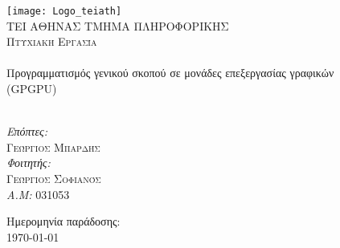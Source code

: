 \begin{titlepage}
\begin{center}

\texttt{[image: Logo\_teiath]}~\\[1cm]

\textsc{\LARGE ΤΕΙ ΑΘΗΝΑΣ ΤΜΗΜΑ ΠΛΗΡΟΦΟΡΙΚΗΣ}\\[1.5cm]

\textsc{\Large Πτυχιακή Εργασία}\\[0.5cm]

\HRule \\[0.4cm]
{\Large Προγραμματισμός γενικού σκοπού σε μονάδες επεξεργασίας γραφικών\\[0.4cm] (GPGPU)} \\[0.4cm]

\HRule \\[1.5cm]

\centering

\emph{Επόπτες:} \\
\textsc{Γεώργιος Μπαρδής}\\[2.5cm]

\emph{Φοιτητής:}\\
\textsc{Γεώργιος Σοφιανός}\\
\emph{A.M:} 031053


\vfill

{Ημερομηνία παράδοσης: \\ \today}

\end{center}
\end{titlepage}